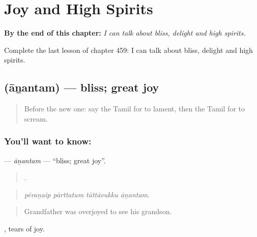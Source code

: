 
\chapter{Joy and High Spirits}
\label{ch:ta-joy-and-high-spirits}

\begin{chapteropening}
\textbf{By the end of this chapter:} \emph{I can talk about bliss, delight and high spirits.}

Complete the last lesson of chapter 459: I can talk about bliss, delight and high spirits.
\end{chapteropening}

\section[\texorpdfstring{\ta{ஆனந்தம்} (āṉantam)}{ஆனந்தம் (āṉantam)}]{ (āṉantam) — bliss; great joy}

\label{lesson:TA-C459-anantam}



\begin{quote}
Before the new one: say the Tamil for to lament, then the Tamil for to scream.
\end{quote}

\subsection*{You'll want to know: }
\textbf{} — \emph{āṉantam} — \textquotedblleft{}bliss; great joy\textquotedblright{}.

\begin{quote}
   .
\end{quote}

\begin{quote}
\emph{pēraṉaip pārttatum tāttāvukku āṉantam.}
\end{quote}

\begin{quote}
Grandfather was overjoyed to see his grandson.
\end{quote}

 , tears of joy.

